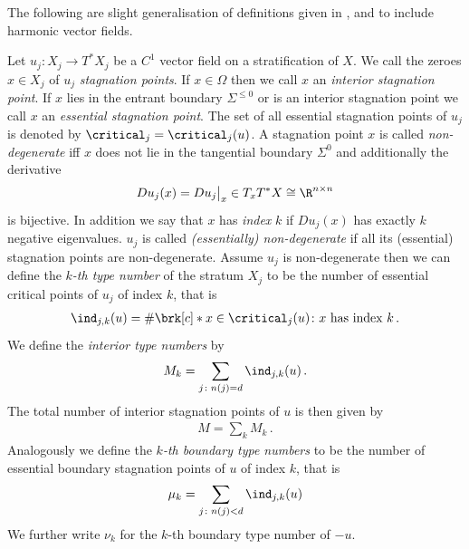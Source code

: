 The following are slight generalisation of definitions given in \cite[p.138f]{Shelton1980}, \cite[§5]{Morse1969} and \cite[p.282f]{Morse1970}
to include harmonic vector fields.
\begin{definition}\label{df:nonDegeneracy}
  Let $u_j\colon X_j\to T^*X_j$ be a $C^1$ vector field on a stratification of $X$.
  We call the zeroes $x\in X_j$ of $u_j$ \emph{stagnation points}.
  If $x\in\Omega$ then we call $x$ an \emph{interior stagnation point}.
  If $x$ lies in the entrant boundary $\Sigma^{\leq0}$ or is an interior stagnation point we call $x$ an \emph{essential stagnation point}.
  The set of all essential stagnation points of $u_j$ is denoted by $\critical_j=\critical_j(u)$.
  A stagnation point $x$ is called
  \emph{non-degenerate} iff $x$ does not lie in the tangential boundary $\Sigma^0$ 
  and additionally the derivative
  \begin{align*}
    Du_j(x)=Du_j\big\vert_x\in T_xT^*X\cong \R^{n\times n}
  \end{align*}
  is bijective.
  In addition we say that $x$ has \emph{index} $k$
  if $Du_j(x)$ has exactly $k$ negative eigenvalues.
  $u_j$ is called \emph{(essentially) non-degenerate} if all its (essential) stagnation points
  are non-degenerate. 
  Assume $u_j$ is non-degenerate then we can define the \emph{$k$-th type number} of the
  stratum $X_j$ to be the number of essential critical points of $u_j$ of index $k$,
  that is
  \begin{align*}
    \ind_{j,k}(u)=\#\brk[c]*{x\in\critical_j(u)\colon x\text{ has index }k}\,.
  \end{align*}
  We define the \emph{interior type numbers} by
  \begin{align*}
    M_k=\sum_{j\colon n(j)=d}\ind_{j,k}(u)\,.
  \end{align*}
  The total number of interior
  stagnation points of $u$ is then given by
  \begin{align*}
    M=\sum_kM_k\,.
  \end{align*}
  Analogously we define the \emph{$k$-th boundary type numbers} to be the number of essential boundary 
  stagnation points of $u$ of index $k$, that is
  \begin{align}
    \mu_k=\sum_{j\colon n(j)<d}\ind_{j,k}(u)\label{eq:bdTypeNbrs}
  \end{align}
  We further write $\nu_k$ for the $k$-th boundary type number of $-u$.
\end{definition}

